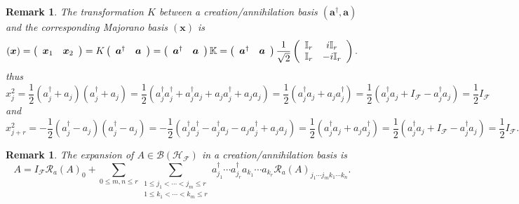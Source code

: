 \documentclass[aps,preprint]{revtex4}%
\newtheorem{remark}[theorem]{Remark}
\begin{document}
\begin{remark}
The transformation $K$ between a creation/annihilation basis $\left(
\boldsymbol{a}^{\dagger},\boldsymbol{a}\right)  $ and the corresponding
Majorano basis $\left(  \boldsymbol{x}\right)  $ is
\begin{equation}
\left(  \boldsymbol{x}\right)  =\left(
\begin{array}
[c]{cc}%
\boldsymbol{x}_{1} & \boldsymbol{x}_{2}%
\end{array}
\right)  =K\left(
\begin{array}
[c]{cc}%
\boldsymbol{a}^{\dagger} & \boldsymbol{a}%
\end{array}
\right)  =\left(
\begin{array}
[c]{cc}%
\boldsymbol{a}^{\dagger} & \boldsymbol{a}%
\end{array}
\right)  \mathbb{K}=\left(
\begin{array}
[c]{cc}%
\boldsymbol{a}^{\dagger} & \boldsymbol{a}%
\end{array}
\right)  \frac{1}{\sqrt{2}}\left(
\begin{array}
[c]{cc}%
\mathbb{I}_{r} & i\mathbb{I}_{r}\\
\mathbb{I}_{r} & -i\mathbb{I}_{r}%
\end{array}
\right)  .
\end{equation}
thus
\begin{equation}
x_{j}^{2}=\frac{1}{2}\left(  a_{j}^{\dagger}+a_{j}\right)  \left(
a_{j}^{\dagger}+a_{j}\right)  =\frac{1}{2}\left(  a_{j}^{\dagger}%
a_{j}^{\dagger}+a_{j}^{\dagger}a_{j}+a_{j}a_{j}^{\dagger}+a_{j}a_{j}\right)
=\frac{1}{2}\left(  a_{j}^{\dagger}a_{j}+a_{j}a_{j}^{\dagger}\right)
=\frac{1}{2}\left(  a_{j}^{\dagger}a_{j}+I_{\mathcal{F}}-a_{j}^{\dagger}%
a_{j}\right)  =\frac{1}{2}I_{\mathcal{F}}%
\end{equation}
and
\begin{equation}
x_{j+r}^{2}=-\frac{1}{2}\left(  a_{j}^{\dagger}-a_{j}\right)  \left(
a_{j}^{\dagger}-a_{j}\right)  =-\frac{1}{2}\left(  a_{j}^{\dagger}%
a_{j}^{\dagger}-a_{j}^{\dagger}a_{j}-a_{j}a_{j}^{\dagger}+a_{j}a_{j}\right)
=\frac{1}{2}\left(  a_{j}^{\dagger}a_{j}+a_{j}a_{j}^{\dagger}\right)
=\frac{1}{2}\left(  a_{j}^{\dagger}a_{j}+I_{\mathcal{F}}-a_{j}^{\dagger}%
a_{j}\right)  =\frac{1}{2}I_{\mathcal{F}}.
\end{equation}

\end{remark}

\begin{remark}
The expansion of $A\in\mathcal{B}\left(  \mathcal{H}_{\mathcal{F}}\right)  $
in a creation/annihilation basis is
\begin{equation}
A=I_{\mathcal{F}}\mathcal{R}_{a}\left(  A\right)  _{0}+\sum_{0\leq m,n\leq
r}\sum_{\substack{1\leq j_{1}<\cdots<j_{m}\leq r\\1\leq k_{1}<\cdots<k_{m}\leq
r}}a_{j_{1}}^{\dagger}\cdots a_{j_{r}}^{\dagger}a_{k_{1}}\cdots a_{k_{r}%
}\mathcal{R}_{a}\left(  A\right)  _{j_{1}\cdots j_{m}k_{1}\cdots k_{n}}.
\end{equation}

\end{remark}
\end{document}
